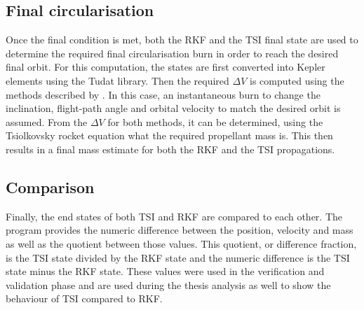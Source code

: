 \subsection{Final circularisation}
\label{subsec:finalCircularisation}
Once the final condition is met, both the \ac{RKF} and the \ac{TSI} final state are used to determine the required final circularisation burn in order to reach the desired final orbit. For this computation, the states are first converted into Kepler elements using the \ac{Tudat} library. Then the required $\Delta V$ is computed using the methods described by \cite{wakker2010}. In this case, an instantaneous burn to change the inclination, flight-path angle and orbital velocity to match the desired orbit is assumed. From the $\Delta V$ for both methods, it can be determined, using   the Tsiolkovsky rocket equation what the required propellant mass is. This then results in a final mass estimate for both the \ac{RKF} and the \ac{TSI} propagations.


\subsection{Comparison}
\label{subsec:comparison}
Finally, the end states of both \ac{TSI} and \ac{RKF} are compared to each other. The program provides the numeric difference between the position, velocity and mass as well as the quotient between those values. This quotient, or difference fraction, is the \ac{TSI} state divided by the \ac{RKF} state and the numeric difference is the \ac{TSI} state minus the \ac{RKF} state. These values were used in the verification and validation phase and are used during the thesis analysis as well to show the behaviour of \ac{TSI} compared to \ac{RKF}.  


